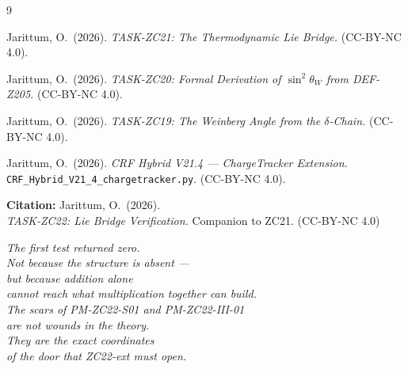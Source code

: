 \documentclass[12pt, a4paper]{article}
\begin{document}
\bigskip
\begin{thebibliography}{9}

  Jarittum, O.\ (2026).
  \textit{TASK-ZC21: The Thermodynamic Lie Bridge.}
  (CC-BY-NC 4.0).

  Jarittum, O.\ (2026).
  \textit{TASK-ZC20: Formal Derivation of $\sin^2\theta_W$ from DEF-Z205.}
  (CC-BY-NC 4.0).

  Jarittum, O.\ (2026).
  \textit{TASK-ZC19: The Weinberg Angle from the $\delta$-Chain.}
  (CC-BY-NC 4.0).

  Jarittum, O.\ (2026).
  \textit{CRF Hybrid V21.4 --- ChargeTracker Extension.}
  \texttt{CRF\_Hybrid\_V21\_4\_chargetracker.py}.
  (CC-BY-NC 4.0).

\end{thebibliography}

\bigskip
\begin{center}
\textbf{Citation:} Jarittum, O.\ (2026).\\
\textit{TASK-ZC22: Lie Bridge Verification.}
Companion to ZC21. (CC-BY-NC 4.0)
\end{center}

\bigskip
\begin{center}
\textit{%
  The first test returned zero.\\
  Not because the structure is absent ---\\
  but because addition alone\\
  cannot reach what multiplication together can build.\\[0.5em]
  The scars of PM-ZC22-S01 and PM-ZC22-III-01\\
  are not wounds in the theory.\\
  They are the exact coordinates\\
  of the door that ZC22-ext must open.%
}
\end{center}

\bigskip
\end{document}
